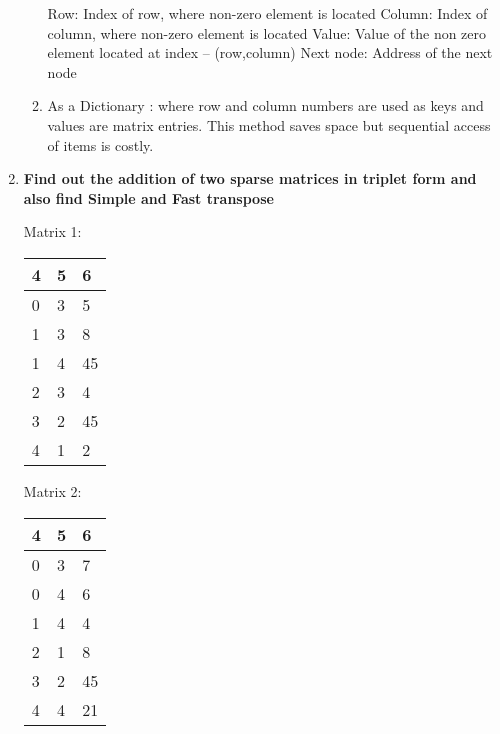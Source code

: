 \documentclass[11pt]{article}
\begin{document}
\begin{enumerate}
\begin{enumerate}
		            Row: Index of row, where non-zero element is located
		            Column: Index of column, where non-zero element is located
		            Value: Value of the non zero element located at index – (row,column)
		            Next node: Address of the next node

		      \item As a Dictionary : where row and column numbers are used as keys and values are matrix entries. This method saves space but sequential access of items is costly.

	      \end{enumerate}

	\item \textbf{Find out the addition of two sparse matrices in triplet form and also find Simple and Fast transpose}
	\pagebreak

	      Matrix 1:
	      \begin{table}[H]
		      \centering
		      \begin{tabular}{|l|l|l|}
			      \hline
			      \textbf{4} & \textbf{5} & \textbf{6} \\ \hline
			      0          & 3          & 5          \\ \hline
			      1          & 3          & 8          \\ \hline
			      1          & 4          & 45         \\ \hline
			      2          & 3          & 4          \\ \hline
			      3          & 2          & 45         \\ \hline
			      4          & 1          & 2          \\ \hline
		      \end{tabular}
	      \end{table}

	      Matrix 2:
	      \begin{table}[H]
		      \centering
		      \begin{tabular}{|l|l|l|}
			      \hline
			      \textbf{4} & \textbf{5} & \textbf{6} \\ \hline
			      0          & 3          & 7          \\ \hline
			      0          & 4          & 6          \\ \hline
			      1          & 4          & 4          \\ \hline
			      2          & 1          & 8          \\ \hline
			      3          & 2          & 45         \\ \hline
			      4          & 4          & 21         \\ \hline
		      \end{tabular}
	      \end{table}


\end{enumerate}
\end{document}
